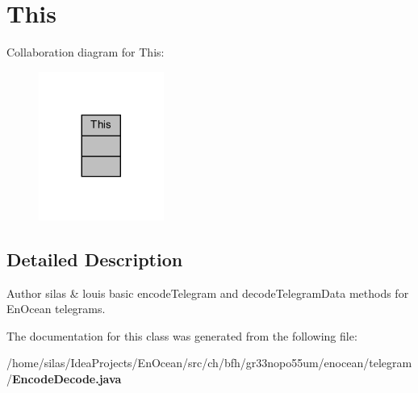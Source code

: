\section{This}
\label{classThis}


Collaboration diagram for This\+:\nopagebreak
\begin{figure}[H]
\begin{center}
\leavevmode
\includegraphics[width=116pt]{d7/d02/classThis__coll__graph}
\end{center}
\end{figure}


\subsection{Detailed Description}
\begin{DoxyAuthor}{Author}
silas \& louis basic encode\+Telegram and decode\+Telegram\+Data methods for En\+Ocean telegrams. 
\end{DoxyAuthor}


The documentation for this class was generated from the following file\+:\begin{DoxyCompactItemize}
\item 
/home/silas/\+Idea\+Projects/\+En\+Ocean/src/ch/bfh/gr33nopo55um/enocean/telegram/{\bf Encode\+Decode.\+java}\end{DoxyCompactItemize}
